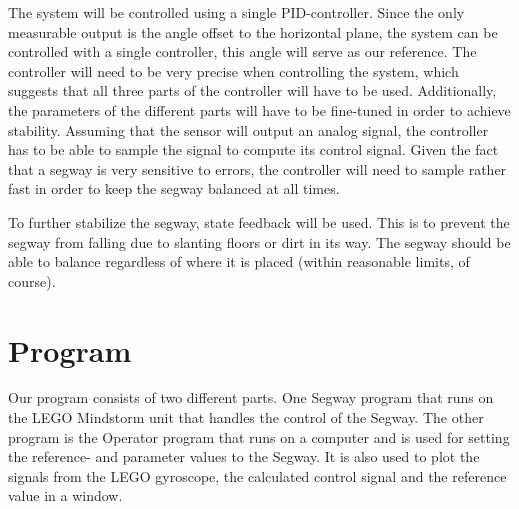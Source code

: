 The system will be controlled using a single PID-controller. Since the only measurable output is the angle offset to the horizontal plane, the system can be controlled with a single controller, this angle will serve as our reference. The controller will need to be very precise when controlling the system, which suggests that all three parts of the controller will have to be used. Additionally, the parameters of the different parts will have to be fine-tuned in order to achieve stability.
    Assuming that the sensor will output an analog signal, the controller has to be able to sample the signal to compute its control signal. Given the fact that a segway is very sensitive to errors, the controller will need to sample rather fast in order to keep the segway balanced at all times.

To further stabilize the segway, state feedback will be used. This is to prevent the segway from falling due to slanting floors or dirt in its way. The segway should be able to balance regardless of where it is placed (within reasonable limits, of course).


\section{Program}
Our program consists of two different parts. One Segway program that runs on the LEGO Mindstorm unit that handles the control of the Segway. The other program is the Operator program that runs on a computer and is used for setting the reference- and parameter values to the Segway. It is also used to plot the signals from the LEGO gyroscope, the calculated control signal and the reference value in a window. 


